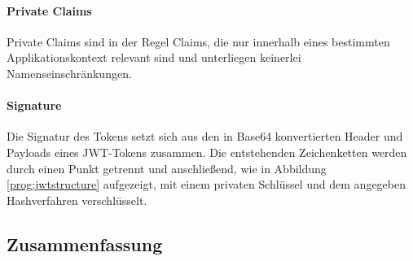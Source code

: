 \paragraph{Private Claims} Private Claims sind in der Regel Claims, die nur innerhalb eines bestimmten Applikationskontext relevant sind und unterliegen keinerlei Namenseinschränkungen.

\paragraph{Signature} Die Signatur des Tokens setzt sich aus den in Base64 konvertierten Header und Payloads eines \ac{JWT}-Tokens zusammen. Die entstehenden Zeichenketten werden durch einen Punkt getrennt und anschließend, wie in Abbildung \ref{prog:jwtstructure} aufgezeigt, mit einem privaten Schlüssel und dem angegeben Hashverfahren verschlüsselt.

\subsection{Zusammenfassung}


